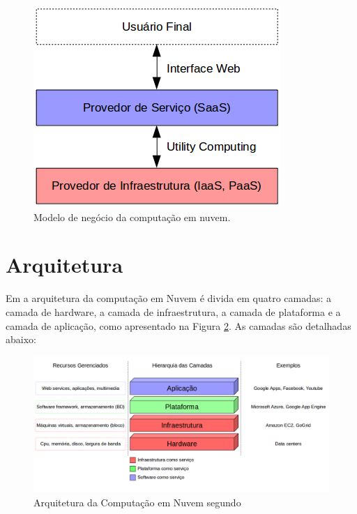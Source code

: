 \begin{figure}[htbp]
  \centering \includegraphics[scale=.6]{imgs/business-model.png}
\caption{Modelo de negócio da computação em nuvem. } 
\label{business-model}
\end{figure}


\section{Arquitetura} \label{cloud:arch}

Em \citep{stateOfArt:2010} a arquitetura da computação em Nuvem é divida em
quatro camadas: a camada de hardware, a camada de infraestrutura, a camada de
plataforma e a camada de aplicação, como apresentado na Figura
\ref{architecture1}. As camadas são detalhadas abaixo:

\begin{figure}[htbp]
  \centering \includegraphics[scale=.4]{imgs/architecture1.png}
\caption{Arquitetura da Computação em Nuvem segundo \citep{stateOfArt:2010}} 
\label{architecture1}
\end{figure}

